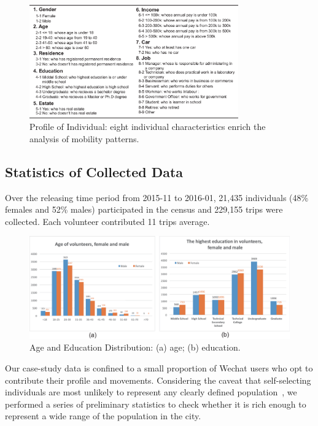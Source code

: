 \documentclass{ieeeaccess}
\begin{document}
\begin{figure}
 \centering
 \includegraphics[width=9cm]{pictures/data_over}
 \captionsetup{justification=centering}
 \caption{Profile of Individual: eight individual characteristics enrich the analysis of mobility patterns.}
 \label{fig:data_over}
\end{figure}



\subsection{Statistics of Collected Data}

Over the releasing time period from 2015-11 to 2016-01, 21,435 individuals (48\% females and 52\% males) participated in the census and 229,155 trips were collected. Each volunteer contributed 11 trips average.

\begin{figure}[htb!]
 \centering %
 \includegraphics[width=\columnwidth]{pictures/data1}
 \caption{Age and Education Distribution: (a) age; (b) education.}
 \label{fig:data_age_edu}
\end{figure}


Our case-study data is confined to a small proportion of Wechat users who opt to contribute their profile  and movements.
Considering the caveat that self-selecting individuals are most unlikely to represent any clearly defined population~\cite{Longley2015}, we performed a series of preliminary statistics to check whether it is rich enough to represent a wide range of the population in the city.
\end{document}
